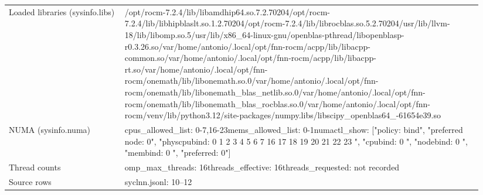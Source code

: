 \begin{longtable}{>{\raggedright\arraybackslash}p{0.23\linewidth}>{\raggedright\arraybackslash}p{0.71\linewidth}}
Loaded libraries (sysinfo.libs) & /\allowbreak{}opt/\allowbreak{}rocm-7.2.4/\allowbreak{}lib/\allowbreak{}libamdhip64.so.7.2.70204\newline /\allowbreak{}opt/\allowbreak{}rocm-7.2.4/\allowbreak{}lib/\allowbreak{}libhipblaslt.so.1.2.70204\newline /\allowbreak{}opt/\allowbreak{}rocm-7.2.4/\allowbreak{}lib/\allowbreak{}librocblas.so.5.2.70204\newline /\allowbreak{}usr/\allowbreak{}lib/\allowbreak{}llvm-18/\allowbreak{}lib/\allowbreak{}libomp.so.5\newline /\allowbreak{}usr/\allowbreak{}lib/\allowbreak{}x86\_\allowbreak{}64-linux-gnu/\allowbreak{}openblas-pthread/\allowbreak{}libopenblasp-r0.3.26.so\newline /\allowbreak{}var/\allowbreak{}home/\allowbreak{}antonio/\allowbreak{}.local/\allowbreak{}opt/\allowbreak{}fnn-rocm/\allowbreak{}acpp/\allowbreak{}lib/\allowbreak{}libacpp-common.so\newline /\allowbreak{}var/\allowbreak{}home/\allowbreak{}antonio/\allowbreak{}.local/\allowbreak{}opt/\allowbreak{}fnn-rocm/\allowbreak{}acpp/\allowbreak{}lib/\allowbreak{}libacpp-rt.so\newline /\allowbreak{}var/\allowbreak{}home/\allowbreak{}antonio/\allowbreak{}.local/\allowbreak{}opt/\allowbreak{}fnn-rocm/\allowbreak{}onemath/\allowbreak{}lib/\allowbreak{}libonemath.so.0\newline /\allowbreak{}var/\allowbreak{}home/\allowbreak{}antonio/\allowbreak{}.local/\allowbreak{}opt/\allowbreak{}fnn-rocm/\allowbreak{}onemath/\allowbreak{}lib/\allowbreak{}libonemath\_\allowbreak{}blas\_\allowbreak{}netlib.so.0\newline /\allowbreak{}var/\allowbreak{}home/\allowbreak{}antonio/\allowbreak{}.local/\allowbreak{}opt/\allowbreak{}fnn-rocm/\allowbreak{}onemath/\allowbreak{}lib/\allowbreak{}libonemath\_\allowbreak{}blas\_\allowbreak{}rocblas.so.0\newline /\allowbreak{}var/\allowbreak{}home/\allowbreak{}antonio/\allowbreak{}.local/\allowbreak{}opt/\allowbreak{}fnn-rocm/\allowbreak{}venv/\allowbreak{}lib/\allowbreak{}python3.12/\allowbreak{}site-packages/\allowbreak{}numpy.libs/\allowbreak{}libscipy\_\allowbreak{}openblas64\_\allowbreak{}-61654e39.so \\
NUMA (sysinfo.numa) & cpus\_\allowbreak{}allowed\_\allowbreak{}list: 0-7,16-23\newline mems\_\allowbreak{}allowed\_\allowbreak{}list: 0-1\newline numactl\_\allowbreak{}show: ["policy: bind", "preferred node: 0", "physcpubind: 0 1 2 3 4 5 6 7 16 17 18 19 20 21 22 23 ", "cpubind: 0 ", "nodebind: 0 ", "membind: 0 ", "preferred: 0"] \\
Thread counts & omp\_\allowbreak{}max\_\allowbreak{}threads: 16\newline threads\_\allowbreak{}effective: 16\newline threads\_\allowbreak{}requested: not recorded \\
Source rows & syclnn.jsonl: 10–12 \\
\end{longtable}

